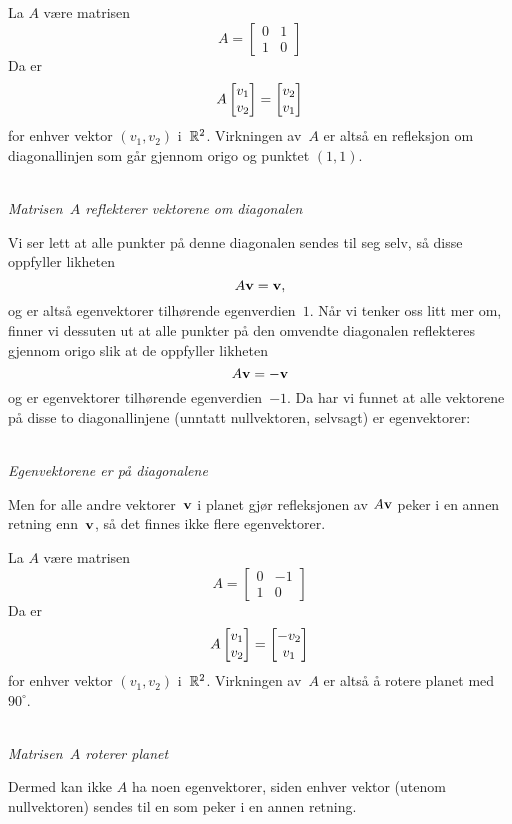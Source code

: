 \begin{ex}
\label{ex:ingen-egenverdier}
La $A$ være matrisen
\[
A =
\begin{bmatrix}
0 & 1 \\
1 & 0
\end{bmatrix}
\]
Da er
\[
A \begin{bmatrix} v_1 \\ v_2 \end{bmatrix} = \begin{bmatrix} v_2 \\ v_1 \end{bmatrix}
\]
for enhver vektor $(v_1, v_2)$ i~$\mathbb{R}^2$.  Virkningen av~$A$ er altså
en refleksjon om diagonallinjen som går gjennom origo og punktet
$(1,1)$.
\begin{center}
\\
{\small \textit{Matrisen~$A$ reflekterer vektorene om diagonalen}}
\end{center}
Vi ser lett at alle punkter på denne diagonalen sendes til seg selv,
så disse oppfyller likheten
\[
A \mathbf{v} = \mathbf{v},
\]
og er altså egenvektorer tilhørende egenverdien~$1$.  Når vi tenker
oss litt mer om, finner vi dessuten ut at alle punkter på den omvendte
diagonalen reflekteres gjennom origo slik at de oppfyller likheten
\[
A \mathbf{v} = - \mathbf{v}
\]
og er egenvektorer tilhørende egenverdien~$-1$.  Da har vi funnet at
alle vektorene på disse to diagonallinjene (unntatt nullvektoren,
selvsagt) er egenvektorer:
\begin{center}
\\
{\small \textit{Egenvektorene er på diagonalene}}
\end{center}
Men for alle andre vektorer~$\mathbf{v}$ i planet gjør refleksjonen av
$A \mathbf{v}$ peker i en annen retning enn~$\mathbf{v}$, så det finnes ikke
flere egenvektorer.
\end{ex}

\begin{ex}
La $A$ være matrisen
\[
A =
\begin{bmatrix}
0 & -1 \\
1 &  0
\end{bmatrix}
\]
Da er
\[
A \begin{bmatrix} v_1 \\ v_2 \end{bmatrix} = \begin{bmatrix} -v_2 \\ v_1 \end{bmatrix}
\]
for enhver vektor $(v_1, v_2)$ i~$\mathbb{R}^2$.  Virkningen av~$A$ er altså
å rotere planet med~$90^{\circ}$.
\begin{center}
\\
{\small \textit{Matrisen~$A$ roterer planet}}
\end{center}
Dermed kan ikke $A$ ha noen egenvektorer, siden enhver vektor (utenom
nullvektoren) sendes til en som peker i en annen retning.
\end{ex}



